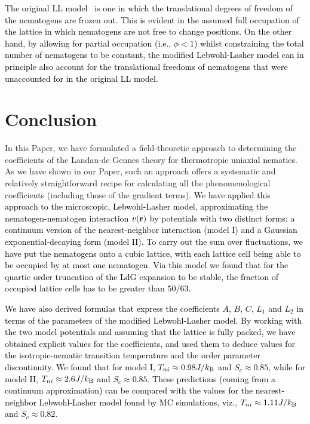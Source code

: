 \documentclass[jcp,aps,twocolumn,showpacs,supergroupedaddress,epsfig,amsmath,amssymb,eqsecnum]{revtex4}
\newcommand{\rv}{{\bf r}}
\newcommand{\bing}[1]{\textcolor{black}{#1}}
\begin{document}
\bing{The original LL model~\cite{lebwohl-lasher1972} is one in which the translational degrees of freedom of the nematogens are frozen out. This is evident in the assumed full occupation of the lattice in which nematogens are not free to change positions. On the other hand, by allowing for partial occupation (i.e., $\phi < 1$) whilst constraining the total number of nematogens to be constant, the modified Lebwohl-Lasher model can in principle also account for the translational freedoms of nematogens that were unaccounted for in the original LL model.  } 

\section{Conclusion}

In this Paper, we have formulated a field-theoretic approach to determining the coefficients of the Landau-de Gennes theory \bing{for thermotropic uniaxial nematics}. As we have shown in our Paper, such an approach offers a systematic and relatively straightforward recipe for calculating all the phenomenological coefficients (including those of the gradient terms). \bing{We have applied this approach to the microscopic, Lebwohl-Lasher model, approximating the nematogen-nematogen interaction $v(\rv)$ by potentials with two distinct forms: a continuum version of the nearest-neighbor interaction (model I) and a Gaussian exponential-decaying form (model II). To carry out the sum over fluctuations, we have put the nematogens onto a cubic lattice, with each lattice cell being able to be occupied by at most one nematogen. Via this model we found that for the quartic order truncation of the LdG expansion to be stable, the fraction of occupied lattice cells has to be greater than $50/63$.} 

\bing{We have also derived formulas that express the coefficients $A$, $B$, $C$, $L_1$ and $L_2$ in terms of the parameters of the modified Lebwohl-Lasher model. By working with the two model potentials and assuming that the lattice is fully packed, we have obtained explicit values for the coefficients, and used them to deduce values for the isotropic-nematic transition temperature and the order parameter discontinuity. We found that for model I, $T_{ni} \approx 0.98 J/k_{{\rm B}}$ and $S_c \approx 0.85$, while for model II, $T_{ni} \approx 2.6 J/k_{{\rm B}}$ and $S_c \approx 0.85$. These predictions (coming from a continuum approximation) can be compared with the values for the nearest-neighbor Lebwohl-Lasher model found by MC simulations, viz., $T_{ni} \approx 1.11 J/k_{{\rm B}}$ and $S_c \approx 0.82$.} 
\end{document}
